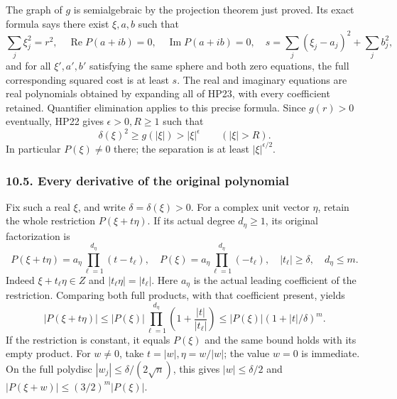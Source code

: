 \documentclass[
  11pt,
]{article}
\begin{document}
The graph of \(g\) is semialgebraic by the projection theorem just
proved. Its exact formula says there exist \(\xi,a,b\) such that \[
\sum_j\xi_j^2=r^2,\quad
\operatorname{Re}P(a+ib)=0,\quad
\operatorname{Im}P(a+ib)=0,\quad
s=\sum_j(\xi_j-a_j)^2+\sum_jb_j^2,
\tag{HP29}
\] and for all \(\xi',a',b'\) satisfying the same sphere and both zero
equations, the full corresponding squared cost is at least \(s\). The
real and imaginary equations are real polynomials obtained by expanding
all of HP23, with every coefficient retained. Quantifier elimination
applies to this precise formula. Since \(g(r)>0\) eventually, HP22 gives
\(\epsilon>0,R\geq1\) such that \[
\delta(\xi)^2\geq g(|\xi|)>|\xi|^\epsilon\qquad(|\xi|>R).
\tag{HP30}
\] In particular \(P(\xi)\ne0\) there; the separation is at least
\(|\xi|^{\epsilon/2}\).

\subsubsection{10.5. Every derivative of the original
polynomial}\label{every-derivative-of-the-original-polynomial}

Fix such a real \(\xi\), and write \(\delta=\delta(\xi)>0\). For a
complex unit vector \(\eta\), retain the whole restriction
\(P(\xi+t\eta)\). If its actual degree \(d_\eta\geq1\), its original
factorization is \[
P(\xi+t\eta)=a_\eta\prod_{\ell=1}^{d_\eta}(t-t_\ell),
\quad
P(\xi)=a_\eta\prod_{\ell=1}^{d_\eta}(-t_\ell),
\quad
|t_\ell|\geq\delta,\quad d_\eta\leq m.
\tag{HP31}
\] Indeed \(\xi+t_\ell\eta\in Z\) and \(|t_\ell\eta|=|t_\ell|\). Here
\(a_\eta\) is the actual leading coefficient of the restriction.
Comparing both full products, with that coefficient present, yields \[
|P(\xi+t\eta)|
\leq |P(\xi)|\prod_{\ell=1}^{d_\eta}
\left(1+\frac{|t|}{|t_\ell|}\right)
\leq |P(\xi)|(1+|t|/\delta)^m.
\tag{HP32}
\] If the restriction is constant, it equals \(P(\xi)\) and the same
bound holds with its empty product. For \(w\ne0\), take
\(t=|w|,\eta=w/|w|\); the value \(w=0\) is immediate. On the full
polydisc \(|w_j|\leq\delta/(2\sqrt n)\), this gives \(|w|\leq\delta/2\)
and \(|P(\xi+w)|\leq(3/2)^m|P(\xi)|\).
\end{document}
